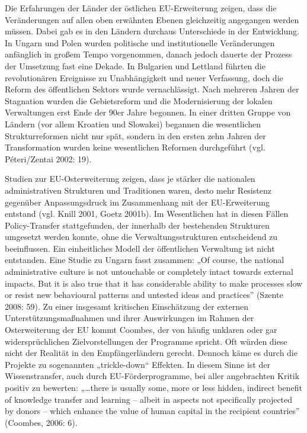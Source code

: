Die Erfahrungen der Länder der östlichen EU-Erweiterung zeigen, dass die Veränderungen auf allen oben erwähnten Ebenen gleichzeitig angegangen werden müssen. Dabei gab es in den Ländern durchaus Unterschiede in der Entwicklung. In Ungarn und Polen wurden politische und institutionelle Veränderungen anfänglich in großem Tempo vorgenommen, danach jedoch dauerte der Prozess der Umsetzung fast eine Dekade. In Bulgarien und Lettland führten die revolutionären Ereignisse zu Unabhängigkeit und neuer Verfassung, doch die Reform des öffentlichen Sektors wurde vernachlässigt. Nach mehreren Jahren der Stagnation wurden die Gebietsreform und die Modernisierung der lokalen Verwaltungen erst Ende der 90er Jahre begonnen. In einer dritten Gruppe von Ländern (vor allem Kroatien und Slowakei) begannen die wesentlichen Strukturreformen nicht nur spät, sondern in den ersten zehn Jahren der Transformation wurden keine wesentlichen Reformen durchgeführt (vgl. Péteri/Zentai 2002: 19). 

Studien zur EU-Osterweiterung zeigen, dass je stärker die nationalen administrativen Strukturen und Traditionen waren, desto mehr Resistenz gegenüber Anpassungsdruck im Zusammenhang mit der EU-Erweiterung entstand (vgl. Knill 2001, Goetz 2001b). Im Wesentlichen hat in diesen Fällen Policy-Transfer stattgefunden, der innerhalb der bestehenden Strukturen umgesetzt werden konnte, ohne die Verwaltungsstrukturen entscheidend zu beeinflussen. Ein einheitliches Modell der öffentlichen Verwaltung ist nicht entstanden. Eine Studie zu Ungarn fasst zusammen: „Of course, the national administrative culture is not untouchable or completely intact towards external impacts. But it is also true that it has considerable ability to make processes slow or resist new behavioural patterns and untested ideas and practices” (Szente 2008: 59). Zu einer insgesamt kritischen Einschätzung der externen Unterstützungsmaßnahmen und ihrer Auswirkungen im Rahmen der Osterweiterung der EU kommt Coombes, der von häufig unklaren oder gar widersprüchlichen Zielvorstellungen der Programme spricht. Oft würden diese nicht der Realität in den Empfängerländern gerecht. Dennoch käme es durch die Projekte zu sogenannten „trickle-down“ Effekten. In diesem Sinne ist der Wissenstransfer, auch durch EU-Förderprogramme, bei aller angebrachten Kritik positiv zu bewerten: „…there is usually some, more or less hidden, indirect benefit of knowledge transfer and learning – albeit in aspects not specifically projected by donors – which enhance the value of human capital in the recipient countries” (Coombes, 2006: 6).

